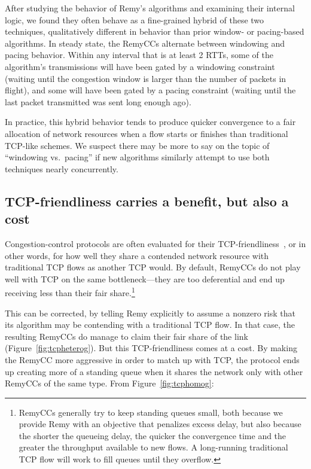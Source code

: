 After studying the behavior of Remy's algorithms and examining their
internal logic, we found they often behave as a fine-grained
hybrid of these two techniques, qualitatively different in behavior
than prior window- or pacing-based algorithms. In steady state, the
RemyCCs alternate between windowing and
pacing behavior. Within any interval that is at least 2 RTTs, some of
the algorithm's transmissions will have been gated by a windowing
constraint (waiting until the congestion window is larger than the
number of packets in flight), and some will have been gated by a
pacing constraint (waiting until the last packet transmitted was sent
long enough ago).

In practice, this hybrid behavior tends to produce quicker convergence to a
fair allocation of network resources when a flow starts or finishes
than traditional TCP-like schemes. We suspect there may be more to say
on the topic of ``windowing vs.~pacing'' if new algorithms similarly
attempt to use both techniques nearly concurrently.

\subsection{TCP-friendliness carries a benefit, but also a cost}

Congestion-control protocols are often evaluated for their
TCP-friendliness~\cite{friendlysurvey}, or in other words, for how
well they share a contended network resource with traditional TCP
flows as another TCP would.  By default, RemyCCs do not
play well with TCP on the same bottleneck---they are too deferential
and end up receiving less than their fair share.\footnote{RemyCCs
  generally try to keep standing queues small, both because we provide
  Remy with an objective that penalizes excess delay, but also because
  the shorter the queueing delay, the quicker the convergence time and
  the greater the throughput available to new flows. A long-running
  traditional TCP flow will work to fill queues until they overflow.}

This can be corrected, by telling Remy explicitly to assume a nonzero
risk that its algorithm may be contending with a traditional TCP
flow. In that case, the resulting RemyCCs do manage to claim their
fair share of the link (Figure~\ref{fig:tcpheterog}). But this
TCP-friendliness comes at a cost. By making the RemyCC more aggressive
in order to match up with TCP, the protocol ends up creating more
of a standing queue when it shares the network only
with other RemyCCs of the same type. From Figure~\ref{fig:tcphomog}:


